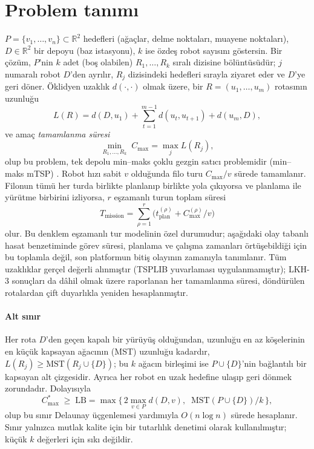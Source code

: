 \section{Problem tanımı}\label{sec:problem}

$P=\{v_1,\dots,v_n\}\subset\mathbb{R}^2$ hedefleri (ağaçlar, delme noktaları,
muayene noktaları), $D\in\mathbb{R}^2$ bir depoyu (baz istasyonu), $k$ ise özdeş robot
sayısını göstersin. Bir çözüm, $P$'nin $k$ adet (boş olabilen) $R_1,\dots,R_k$ sıralı
dizisine bölüntüsüdür; $j$ numaralı robot $D$'den ayrılır, $R_j$ dizisindeki hedefleri sırayla ziyaret eder ve
$D$'ye geri döner. Öklidyen uzaklık $d(\cdot,\cdot)$ olmak üzere, bir
$R=(u_1,\dots,u_m)$ rotasının uzunluğu
\begin{equation}
L(R) = d(D,u_1) + \sum_{t=1}^{m-1} d(u_t,u_{t+1}) + d(u_m,D),
\end{equation}
ve amaç \emph{tamamlanma süresi}
\begin{equation}
\min_{R_1,\dots,R_k}\; C_{\max} = \max_{j} L(R_j),
\end{equation}
olup bu problem, tek depolu min--maks çoklu gezgin satıcı problemidir
(min--maks mTSP) \citep{bektas2006,necula2015}. Robot hızı sabit $v$ olduğunda
filo turu $C_{\max}/v$ sürede tamamlanır. Filonun tümü her turda birlikte planlanıp
birlikte yola çıkıyorsa ve planlama ile yürütme birbirini izliyorsa, $r$ eşzamanlı
turun toplam süresi
\begin{equation}\label{eq:mission}
T_{\text{mission}} = \sum_{\rho=1}^{r}\Big(t_{\text{plan}}^{(\rho)} + C_{\max}^{(\rho)}/v\Big)
\end{equation}
olur. Bu denklem eşzamanlı tur modelinin özel durumudur; aşağıdaki olay tabanlı
hasat benzetiminde görev süresi, planlama ve çalışma zamanları örtüşebildiği için
bu toplamla değil, son platformun bitiş olayının zamanıyla tanımlanır.
Tüm uzaklıklar gerçel değerli alınmıştır (TSPLIB yuvarlaması uygulanmamıştır); LKH-3 sonuçları da dâhil olmak üzere
raporlanan her tamamlanma süresi, döndürülen rotalardan çift duyarlıkla yeniden hesaplanmıştır.

\paragraph{Alt sınır} Her rota $D$'den geçen kapalı bir yürüyüş olduğundan, uzunluğu
en az köşelerinin en küçük kapsayan ağacının (MST) uzunluğu kadardır,
$L(R_j)\ge \mathrm{MST}(R_j\cup\{D\})$; bu $k$ ağacın birleşimi ise $P\cup\{D\}$'nin
bağlantılı bir kapsayan alt çizgesidir. Ayrıca her robot en uzak hedefine
ulaşıp geri dönmek zorundadır. Dolayısıyla
\begin{equation}\label{eq:lb}
C_{\max}^{*} \;\ge\; \mathrm{LB} = \max\Big\{\,2\max_{v\in P} d(D,v),\;\; \mathrm{MST}(P\cup\{D\})/k\,\Big\},
\end{equation}
olup bu sınır Delaunay üçgenlemesi yardımıyla $O(n\log n)$ sürede hesaplanır. Sınır yalnızca
mutlak kalite için bir tutarlılık denetimi olarak kullanılmıştır; küçük $k$ değerleri için sıkı değildir.

